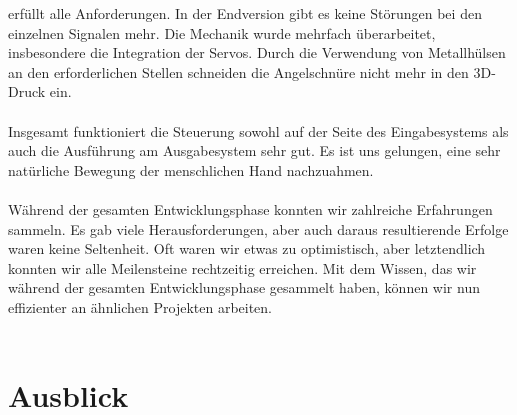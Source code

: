 \documentclass[titlepage,12pt,twoside]{article}
\begin{document}
erfüllt alle Anforderungen. In der Endversion gibt es keine Störungen bei den 
einzelnen Signalen mehr. Die Mechanik wurde mehrfach überarbeitet, insbesondere 
die Integration der Servos. Durch die Verwendung von Metallhülsen an den erforderlichen 
Stellen schneiden die Angelschnüre nicht mehr in den 3D-Druck ein. \\
\\
Insgesamt funktioniert die Steuerung sowohl auf der Seite des Eingabesystems 
als auch die Ausführung am Ausgabesystem sehr gut. Es ist uns gelungen, eine 
sehr natürliche Bewegung der menschlichen Hand nachzuahmen. \\
\\
Während der gesamten Entwicklungsphase konnten wir zahlreiche Erfahrungen 
sammeln. Es gab viele Herausforderungen, aber auch daraus resultierende 
Erfolge waren keine Seltenheit. Oft waren wir etwas zu optimistisch, aber 
letztendlich konnten wir alle Meilensteine rechtzeitig erreichen. Mit dem 
Wissen, das wir während der gesamten Entwicklungsphase gesammelt haben, können
wir nun effizienter an ähnlichen Projekten arbeiten. \\
\\

\newpage
\section{Ausblick}
\label{chap:Ausblick}
\end{document}
